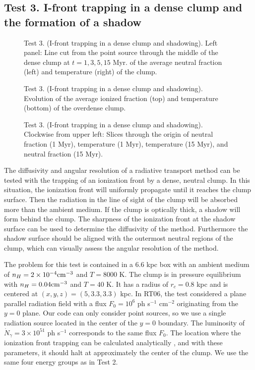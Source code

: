 \documentclass[12pt,preprint]{aastex}
\begin{document}
\subsection{Test 3. I-front trapping in a dense clump and the
  formation of a shadow}
\label{sec:test3}

\begin{figure}[t]
  \caption{\label{fig:test3_1} Test 3. (I-front trapping in a dense
    clump and shadowing).  Left panel: Line cut from the point source
    through the middle of the dense clump at $t = 1, 3, 5, 15$ Myr.
    of the average neutral fraction (left) and temperature
    (right) of the clump.}
\end{figure}

\begin{figure}[t]
  \caption{\label{fig:test3_2} Test 3. (I-front trapping in a dense
    clump and shadowing).  Evolution of the average ionized fraction
    (top) and temperature (bottom) of the overdense clump.}
\end{figure}

\begin{figure}[t]
  \caption{\label{fig:test3_3} Test 3. (I-front trapping in a dense
    clump and shadowing).  Clockwise from upper left: Slices through
    the origin of neutral fraction (1 Myr), temperature (1 Myr),
    temperature (15 Myr), and neutral fraction (15 Myr).}
\end{figure}

The diffusivity and angular resolution of a radiative transport method
can be tested with the trapping of an ionization front by a dense,
neutral clump.  In this situation, the ionization front will uniformly
propagate until it reaches the clump surface.  Then the radiation in
the line of sight of the clump will be absorbed more than the ambient
medium.  If the clump is optically thick, a shadow will form behind
the clump.  The sharpness of the ionization front at the shadow
surface can be used to determine the diffusivity of the method.
Furthermore the shadow surface should be aligned with the outermost
neutral regions of the clump, which can visually assess the angular
resolution of the method.

The problem for this test is contained in a 6.6 kpc box with an
ambient medium of $n_H = 2 \times 10^{-4} \cubecm$ and $T = 8000$ K.
The clump is in pressure equilibrium with $n_H = 0.04 \cubecm$ and $T
= 40$ K.  It has a radius of $r_c = 0.8$ kpc and is centered at
$(x,y,z) = (5, 3.3, 3.3)$ kpc.  In RT06, the test considered a plane
parallel radiation field with a flux $F_0 = 10^6$ ph s$^{-1}$
cm$^{-2}$ originating from the $y=0$ plane.  Our code can only
consider point sources, so we use a single radiation source located in
the center of the $y=0$ boundary.  The luminosity of $\dot{N}_\gamma =
3 \times 10^{51}$ ph s$^{-1}$ corresponds to the same flux $F_0$.  The
location where the ionization front trapping can be calculated
analytically \citep{Shapiro04}, and with these parameters, it should
halt at approximately the center of the clump.  We use the same four
energy groups as in Test 2.
\end{document}
